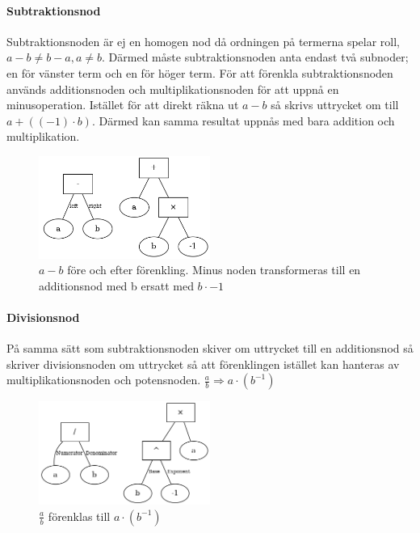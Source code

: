 \documentclass[12pt,a4paper]{article}
\begin{document}
\paragraph{Subtraktionsnod}
Subtraktionsnoden är ej en homogen nod då ordningen på termerna spelar roll, \(a-b\neq b-a, a \neq b\). Därmed måste subtraktionsnoden anta endast två subnoder; en för vänster term och en för höger term. För att förenkla subtraktionsnoden används additionsnoden och multiplikationsnoden för att uppnå en minusoperation. Istället för att direkt räkna ut \(a-b\) så skrivs uttrycket om till \(a+((-1)\cdot b)\). Därmed kan samma resultat uppnås med bara addition och multiplikation.
\begin{figure}[h!]
  \centering
  \includegraphics[width=0.5\textwidth]{image-merged3.png}
  \caption{\(a-b\) före och efter förenkling. Minus noden transformeras till en additionsnod med b ersatt med \(b \cdot -1\)}
\end{figure}
\paragraph{Divisionsnod}
\label{subsubsec:divnode}
På samma sätt som subtraktionsnoden skiver om uttrycket till en additionsnod så skriver divisionsnoden om uttrycket så att förenklingen istället kan hanteras av multiplikationsnoden och potensnoden. \(\frac{a}{b}\Rightarrow a \cdot \left(b^{-1}\right)\)
\begin{figure}[h!]
  \centering
  \includegraphics[width=0.5\textwidth]{image-merged4.png}
  \caption{\(\frac{a}{b}\) förenklas till \(a \cdot \left(b^{-1}\right)\)}
\end{figure}
\newpage
\end{document}
